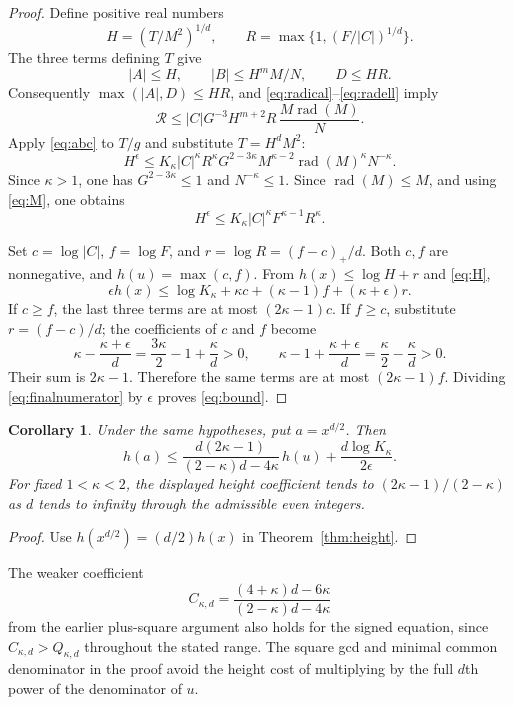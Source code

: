 \documentclass[11pt,a4paper]{article}
\newtheorem{corollary}[theorem]{Corollary}
\DeclareMathOperator{\rad}{rad}
\begin{document}
\begin{proof}
Define positive real numbers
\[
 H=(T/M^2)^{1/d},\qquad
 R=\max\{1,(F/|C|)^{1/d}\}.
\]
The three terms defining $T$ give
\[
 |A|\le H,\qquad |B|\le H^mM/N,\qquad D\le HR.
\]
Consequently $\max(|A|,D)\le HR$, and
\eqref{eq:radical}--\eqref{eq:radell} imply
\[
 \mathcal R\le
 |C|G^{-3} H^{m+2}R\,\frac{M\rad(M)}N.
\]
Apply \eqref{eq:abc} to $T/g$ and substitute $T=H^dM^2$:
\[
 H^\epsilon\le
 K_\kappa |C|^\kappa R^\kappa
 G^{2-3\kappa}M^{\kappa-2}\rad(M)^\kappa N^{-\kappa}.
\]
Since $\kappa>1$, one has $G^{2-3\kappa}\le1$ and
$N^{-\kappa}\le1$. Since $\rad(M)\le M$, and using
\eqref{eq:M}, one obtains
\begin{equation}\label{eq:H}
 H^\epsilon\le
 K_\kappa |C|^\kappa F^{\kappa-1}R^\kappa.
\end{equation}

Set $c=\log|C|$, $f=\log F$, and
$r=\log R=(f-c)_+/d$. Both $c,f$ are nonnegative, and
$h(u)=\max(c,f)$. From $h(x)\le\log H+r$ and
\eqref{eq:H},
\begin{equation}\label{eq:finalnumerator}
 \epsilon h(x)\le
 \log K_\kappa+\kappa c+(\kappa-1)f+(\kappa+\epsilon)r.
\end{equation}
If $c\ge f$, the last three terms are at most
$(2\kappa-1)c$. If $f\ge c$, substitute $r=(f-c)/d$;
the coefficients of $c$ and $f$ become
\[
 \kappa-\frac{\kappa+\epsilon}{d}
   =\frac{3\kappa}{2}-1+\frac\kappa d>0,
 \qquad
 \kappa-1+\frac{\kappa+\epsilon}{d}
   =\frac\kappa2-\frac\kappa d>0.
\]
Their sum is $2\kappa-1$. Therefore the same terms are at most
$(2\kappa-1)f$. Dividing \eqref{eq:finalnumerator} by
$\epsilon$ proves \eqref{eq:bound}.
\end{proof}

\begin{corollary}\label{cor:powered}
Under the same hypotheses, put $a=x^{d/2}$. Then
\[
 h(a)\le
 \frac{d(2\kappa-1)}{(2-\kappa)d-4\kappa}\,h(u)
 +\frac{d\log K_\kappa}{2\epsilon}.
\]
For fixed $1<\kappa<2$, the displayed height coefficient tends to
$(2\kappa-1)/(2-\kappa)$ as $d$ tends to infinity through the
admissible even integers.
\end{corollary}
\begin{proof}
Use $h(x^{d/2})=(d/2)h(x)$ in Theorem~\ref{thm:height}.
\end{proof}

The weaker coefficient
\[
 C_{\kappa,d}=
 \frac{(4+\kappa)d-6\kappa}{(2-\kappa)d-4\kappa}
\]
from the earlier plus-square argument also holds for the signed
equation, since $C_{\kappa,d}>Q_{\kappa,d}$ throughout the stated
range. The square gcd and minimal common denominator in the proof
avoid the height cost of multiplying by the full $d$th power of
the denominator of $u$.
\end{document}
